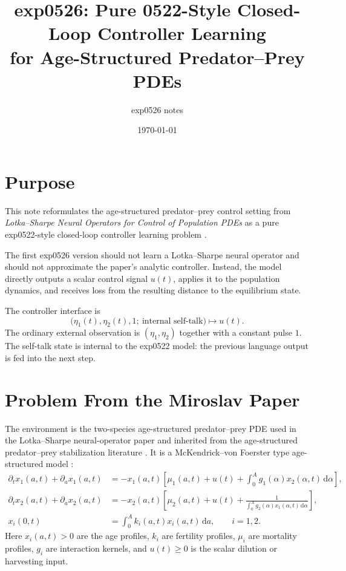 \documentclass[11pt]{article}
\title{exp0526: Pure 0522-Style Closed-Loop Controller Learning\\
for Age-Structured Predator--Prey PDEs}
\author{exp0526 notes}
\date{\today}
\newcommand{\dd}{\,\mathrm{d}}
\begin{document}
\maketitle

\section{Purpose}

This note reformulates the age-structured predator--prey control setting
from \emph{Lotka--Sharpe Neural Operators for Control of Population PDEs}
as a pure exp0522-style closed-loop controller learning problem
\cite{krstic2026lotkasharpe}.

The first exp0526 version should not learn a Lotka--Sharpe neural
operator and should not approximate the paper's analytic controller.
Instead, the model directly outputs a scalar control signal \(u(t)\),
applies it to the population dynamics, and receives loss from the
resulting distance to the equilibrium state.

The controller interface is
\[
  \big(\eta_1(t),\eta_2(t),1;\ \text{internal self-talk}\big)
  \longmapsto
  u(t).
\]
The ordinary external observation is \((\eta_1,\eta_2)\) together with a
constant pulse \(1\). The self-talk state is internal to the exp0522
model: the previous language output is fed into the next step.

\section{Problem From the Miroslav Paper}

The environment is the two-species age-structured predator--prey PDE
used in the Lotka--Sharpe neural-operator paper and inherited from the
age-structured predator--prey stabilization literature
\cite{krstic2026lotkasharpe,veil2026stabilization}. It is a
McKendrick--von Foerster type age-structured model
\cite{mckendrick1925applications}:
\begin{subequations}
\label{eq:full-pde}
\begin{align}
  \partial_t x_1(a,t)+\partial_a x_1(a,t)
  &=
  -x_1(a,t)
  \left[
    \mu_1(a,t)+u(t)
    +\int_0^A g_1(\alpha)x_2(\alpha,t)\dd\alpha
  \right],
  \\
  \partial_t x_2(a,t)+\partial_a x_2(a,t)
  &=
  -x_2(a,t)
  \left[
    \mu_2(a,t)+u(t)
    +\frac{1}{\int_0^A g_2(\alpha)x_1(\alpha,t)\dd\alpha}
  \right],
  \\
  x_i(0,t)
  &=
  \int_0^A k_i(a,t)x_i(a,t)\dd a,
  \qquad i=1,2.
\end{align}
\end{subequations}
Here \(x_i(a,t)>0\) are the age profiles, \(k_i\) are fertility profiles,
\(\mu_i\) are mortality profiles, \(g_i\) are interaction kernels, and
\(u(t)\ge 0\) is the scalar dilution or harvesting input.
\end{document}
